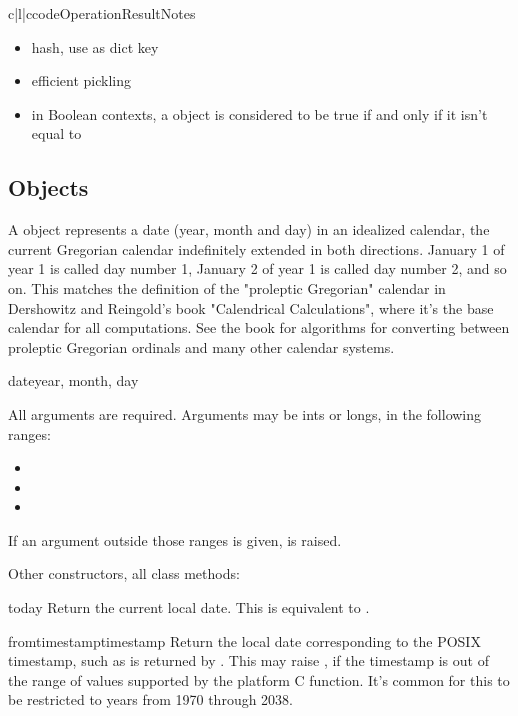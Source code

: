 \begin{tableiii}{c|l|c}{code}{Operation}{Result}{Notes}
\begin{itemize}
  \item
    hash, use as dict key

  \item
    efficient pickling

  \item
    in Boolean contexts, a  object is considered to be true
    if and only if it isn't equal to 
\end{itemize}


\subsection{ Objects \label{datetime-date}}

A  object represents a date (year, month and day) in an idealized
calendar, the current Gregorian calendar indefinitely extended in both
directions.  January 1 of year 1 is called day number 1, January 2 of year
1 is called day number 2, and so on.  This matches the definition of the
"proleptic Gregorian" calendar in Dershowitz and Reingold's book
"Calendrical Calculations", where it's the base calendar for all
computations.  See the book for algorithms for converting between
proleptic Gregorian ordinals and many other calendar systems.

\begin{funcdesc}{date}{year, month, day}

    All arguments are required.  Arguments may be ints or longs, in the
    following ranges:

\begin{itemize}
  \item {}
  \item {}
  \item {}
\end{itemize}

If an argument outside those ranges is given, 
is raised.
\end{funcdesc}

Other constructors, all class methods:

\begin{methoddesc}{today}{}
    Return the current local date.  This is equivalent to
    .
\end{methoddesc}

\begin{methoddesc}{fromtimestamp}{timestamp}
    Return the local date corresponding to the POSIX timestamp, such
    as is returned by .  This may raise
    , if the timestamp is out of the range of
    values supported by the platform C 
    function.  It's common for this to be restricted to years from 1970
    through 2038.
\end{methoddesc}


\end{tableiii}
